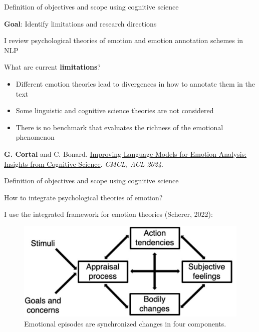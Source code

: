 \documentclass[handout,10pt]{beamer}
\begin{document}
\begin{frame}{Definition of objectives and scope using cognitive science}

\textbf{Goal}: Identify limitations and research directions

\pause
\vspace{0.5cm}

I review psychological theories of emotion and emotion annotation schemes in NLP

\pause
\vspace{0.5cm}

What are current \textbf{limitations}? 

\begin{itemize}[<+->]
    \item Different emotion theories lead to divergences in how to annotate them in the text
    \item Some linguistic and cognitive science theories are not considered
    \item There is no benchmark that evaluates the richness of the emotional phenomenon
\end{itemize}


\vspace{0.5cm}

\scriptsize

\textbf{G. Cortal} and C. Bonard. \href{https://aclanthology.org/2024.cmcl-1.23/}{Improving Language Models for Emotion Analysis: Insights from Cognitive Science}. \textit{CMCL, ACL 2024}.
    
\end{frame}

\begin{frame}{Definition of objectives and scope using cognitive science}

How to integrate psychological theories of emotion?

\pause
\vspace{0.5cm}

I use the integrated framework for emotion theories (Scherer, 2022):

\begin{figure}
    \centering
    \includegraphics[width=0.8\linewidth]{img/scherer_integrated_framework.png}
    \caption{Emotional episodes are synchronized changes in four components.}
    \label{fig:placeholder}
\end{figure}
    
\end{frame}
\end{document}
